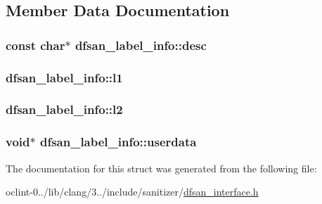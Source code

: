 \subsection{Member Data Documentation}
\hypertarget{structdfsan__label__info_a8633e0763c04793542a3c2d4875a84c8}{
\subsubsection[{desc}]{\setlength{\rightskip}{0pt plus 5cm}const char$\ast$ dfsan\-\_\-label\-\_\-info\-::desc}}\label{structdfsan__label__info_a8633e0763c04793542a3c2d4875a84c8}
\hypertarget{structdfsan__label__info_a82901a96164283d57c24275e2d3a7ead}{
\subsubsection[{l1}]{ dfsan\-\_\-label\-\_\-info\-::l1}}\label{structdfsan__label__info_a82901a96164283d57c24275e2d3a7ead}
\hypertarget{structdfsan__label__info_a6b9bf4180217f8f3d3fd62ebfbe3e3fd}{
\subsubsection[{l2}]{ dfsan\-\_\-label\-\_\-info\-::l2}}\label{structdfsan__label__info_a6b9bf4180217f8f3d3fd62ebfbe3e3fd}
\hypertarget{structdfsan__label__info_a66abef76ed966704b1b87bb07ad205a6}{
\subsubsection[{userdata}]{\setlength{\rightskip}{0pt plus 5cm}void$\ast$ dfsan\-\_\-label\-\_\-info\-::userdata}}\label{structdfsan__label__info_a66abef76ed966704b1b87bb07ad205a6}


The documentation for this struct was generated from the following file\-:\begin{DoxyCompactItemize}
\item 
oclint-\/0../lib/clang/3../include/sanitizer/\hyperlink{dfsan__interface_8h}{dfsan\-\_\-interface.\-h}\end{DoxyCompactItemize}

